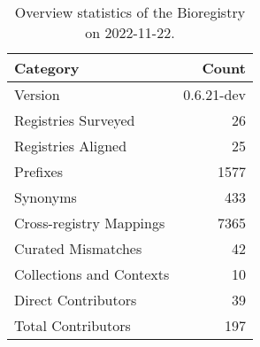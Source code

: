\begin{table}
\centering
\caption{Overview statistics of the Bioregistry on 2022-11-22.}
\label{tab:bioregistry-summary}
\begin{tabular}{lr}
\toprule
                Category &      Count \\
\midrule
                 Version & 0.6.21-dev \\
     Registries Surveyed &         26 \\
      Registries Aligned &         25 \\
                Prefixes &       1577 \\
                Synonyms &        433 \\
 Cross-registry Mappings &       7365 \\
      Curated Mismatches &         42 \\
Collections and Contexts &         10 \\
     Direct Contributors &         39 \\
      Total Contributors &        197 \\
\bottomrule
\end{tabular}
\end{table}
